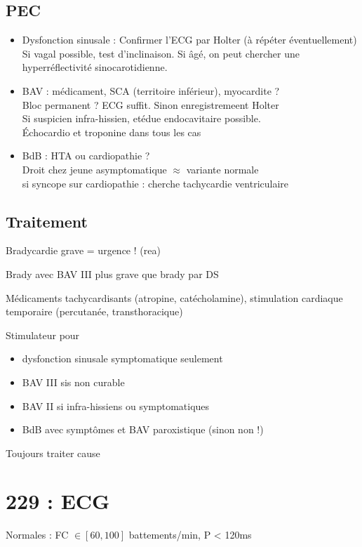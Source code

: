 \documentclass{article}
\begin{document}
\subsection{PEC}
\begin{itemize}
  \item 
Dysfonction sinusale : Confirmer l'ECG par Holter (à répéter éventuellement)
Si vagal possible, test d'inclinaison. Si âgé, on peut chercher une
hyperréflectivité sinocarotidienne.
\item BAV : médicament, SCA (territoire inférieur), myocardite ? \\
  Bloc permanent ? ECG suffit. Sinon enregistremeent Holter \\
  Si suspicien infra-hissien, etédue endocavitaire possible.\\
  Échocardio et troponine dans tous les cas
\item BdB : HTA ou cardiopathie ?\\
  Droit chez jeune asymptomatique $\approx$ variante normale\\
  si syncope sur cardiopathie : cherche tachycardie ventriculaire
\end{itemize}

\subsection{Traitement}
Bradycardie grave = urgence ! (rea) \skull

Brady avec BAV III plus grave que brady par DS

Médicaments tachycardisants (atropine, catécholamine), stimulation cardiaque
temporaire (percutanée, transthoracique)

Stimulateur pour 
\begin{itemize}
  \item dysfonction sinusale symptomatique seulement
  \item BAV III sis non curable
  \item BAV II si infra-hissiens ou symptomatiques
  \item BdB avec symptômes et BAV paroxistique (sinon non !)
\end{itemize}
Toujours traiter cause



\section{229 : ECG}%
\label{sec:229_ecg}
Normales : FC $\in [60, 100]$ battements/min, P < 120ms
\end{document}
